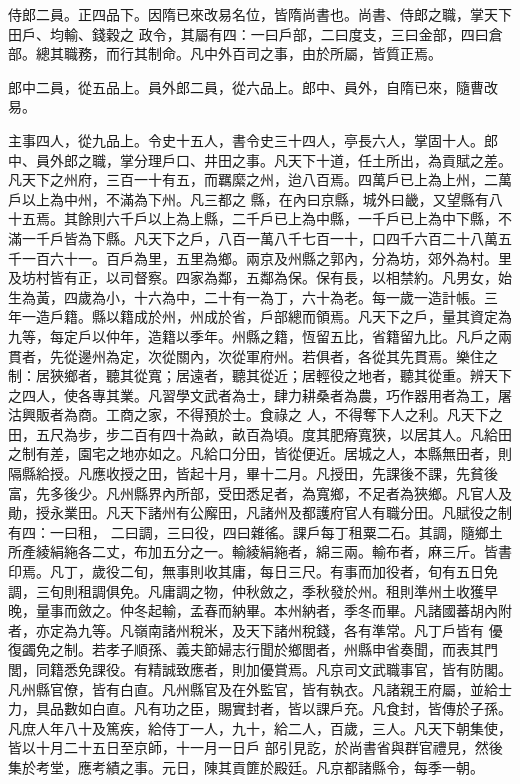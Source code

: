 \begin{pinyinscope}
 侍郎二員。正四品下。因隋已來改易名位，皆隋尚書也。尚書、侍郎之職，掌天下田戶、均輸、錢穀之
 政令，其屬有四：一曰戶部，二曰度支，三曰金部，四曰倉部。總其職務，而行其制命。凡中外百司之事，由於所屬，皆質正焉。



 郎中二員，從五品上。員外郎二員，從六品上。郎中、員外，自隋已來，隨曹改易。



 主事四人，從九品上。令史十五人，書令史三十四人，亭長六人，掌固十人。郎中、員外郎之職，掌分理戶口、井田之事。凡天下十道，任土所出，為貢賦之差。凡天下之州府，三百一十有五，而羈縻之州，迨八百焉。四萬戶已上為上州，二萬戶以上為中州，不滿為下州。凡三都之
 縣，在內曰京縣，城外曰畿，又望縣有八十五焉。其餘則六千戶以上為上縣，二千戶已上為中縣，一千戶已上為中下縣，不滿一千戶皆為下縣。凡天下之戶，八百一萬八千七百一十，口四千六百二十八萬五千一百六十一。百戶為里，五里為鄉。兩京及州縣之郭內，分為坊，郊外為村。里及坊村皆有正，以司督察。四家為鄰，五鄰為保。保有長，以相禁約。凡男女，始生為黃，四歲為小，十六為中，二十有一為丁，六十為老。每一歲一造計帳。三
 年一造戶籍。縣以籍成於州，州成於省，戶部總而領焉。凡天下之戶，量其資定為九等，每定戶以仲年，造籍以季年。州縣之籍，恆留五比，省籍留九比。凡戶之兩貫者，先從邊州為定，次從關內，次從軍府州。若俱者，各從其先貫焉。樂住之制：居狹鄉者，聽其從寬；居遠者，聽其從近；居輕役之地者，聽其從重。辨天下之四人，使各專其業。凡習學文武者為士，肆力耕桑者為農，巧作器用者為工，屠沽興販者為商。工商之家，不得預於士。食祿之
 人，不得奪下人之利。凡天下之田，五尺為步，步二百有四十為畝，畝百為頃。度其肥瘠寬狹，以居其人。凡給田之制有差，園宅之地亦如之。凡給口分田，皆從便近。居城之人，本縣無田者，則隔縣給授。凡應收授之田，皆起十月，畢十二月。凡授田，先課後不課，先貧後富，先多後少。凡州縣界內所部，受田悉足者，為寬鄉，不足者為狹鄉。凡官人及勛，授永業田。凡天下諸州有公廨田，凡諸州及都護府官人有職分田。凡賦役之制有四：一曰租，
 二曰調，三曰役，四曰雜徭。課戶每丁租粟二石。其調，隨鄉土所產綾絹絁各二丈，布加五分之一。輸綾絹絁者，綿三兩。輸布者，麻三斤。皆書印焉。凡丁，歲役二旬，無事則收其庸，每日三尺。有事而加役者，旬有五日免調，三旬則租調俱免。凡庸調之物，仲秋斂之，季秋發於州。租則準州土收獲早晚，量事而斂之。仲冬起輸，孟春而納畢。本州納者，季冬而畢。凡諸國蕃胡內附者，亦定為九等。凡嶺南諸州稅米，及天下諸州稅錢，各有準常。凡丁戶皆有
 優復蠲免之制。若孝子順孫、義夫節婦志行聞於鄉閭者，州縣申省奏聞，而表其門閭，同籍悉免課役。有精誠致應者，則加優賞焉。凡京司文武職事官，皆有防閣。凡州縣官僚，皆有白直。凡州縣官及在外監官，皆有執衣。凡諸親王府屬，並給士力，具品數如白直。凡有功之臣，賜實封者，皆以課戶充。凡食封，皆傳於子孫。凡庶人年八十及篤疾，給侍丁一人，九十，給二人，百歲，三人。凡天下朝集使，皆以十月二十五日至京師，十一月一日戶
 部引見訖，於尚書省與群官禮見，然後集於考堂，應考績之事。元日，陳其貢篚於殿廷。凡京都諸縣令，每季一朝。




\end{pinyinscope}
